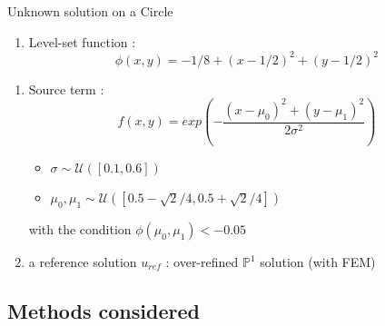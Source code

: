 \documentclass[compress,10pt,xcolor={table,dvipsnames},t]{beamer}
\begin{document}
	\begin{frame}{Unknown solution on a Circle}
		\begin{minipage}{0.3\linewidth}
			\centering
		\end{minipage} \;
		\begin{minipage}{0.68\linewidth}
			\begin{enumerate}[\ding{217}]
				\item Level-set function : 
				$$\phi(x,y)=-1/8+(x-1/2)^2+(y-1/2)^2$$
			\end{enumerate}
		\end{minipage}
		\begin{enumerate}[\ding{217}]
			\item Source term : 
			$$f(x,y) = exp\left(-\frac{(x-\mu_0)^2 + (y-\mu_1)^2}{2\sigma^2}\right)$$
			\begin{itemize}
				\item $\sigma \sim \mathcal{U}([0.1,0.6])$
				\item $\mu_0, \mu_1 \sim \mathcal{U}([0.5-\sqrt{2}/4, 0.5+\sqrt{2}/4])$ 
			\end{itemize}
			with the condition $\phi(\mu_0, \mu_1) < -0.05$
			\item a reference solution $u_{ref}$ : over-refined $\mathbb{P}^1$ solution (with FEM)
		\end{enumerate}
	\end{frame}
	
	\subsection{Methods considered}
	
\end{document}
